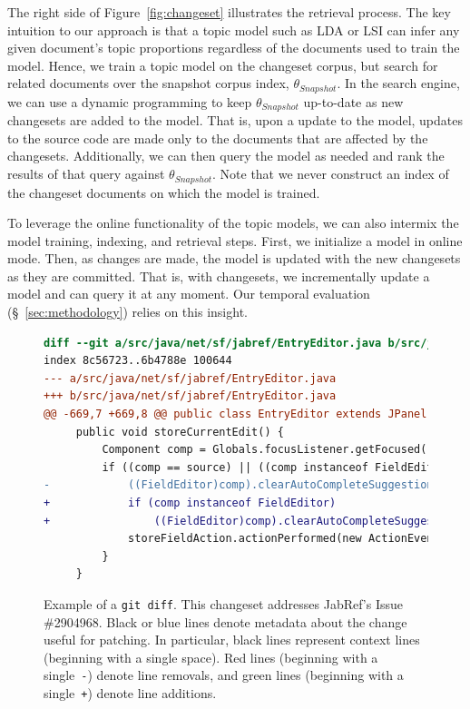 The right side of Figure~\ref{fig:changeset} illustrates the retrieval process.
The key intuition to our approach is that a topic model such as LDA or LSI
can infer any given document's topic proportions regardless of the documents used to train the model.
Hence, we train a topic model on the changeset corpus, but search for related documents over the snapshot corpus index, $\theta_{Snapshot}$.
In the search engine, we can use a dynamic programming to keep $\theta_{Snapshot}$ up-to-date as new changesets are added to the model.
That is, upon a update to the model, updates to the source code are made only to the documents that are affected by the changesets.
Additionally, we can then query the model as needed and rank the results of that query against $\theta_{Snapshot}$.
Note that we never construct an index of the changeset documents on which the model is trained.

To leverage the online functionality of the topic models, we can also intermix the model training, indexing, and retrieval steps.
First, we initialize a model in online mode.
Then, as changes are made, the model is updated with the new changesets as they are committed.
That is, with changesets, we incrementally update a model and can query it at any moment.
Our temporal evaluation (\S~\ref{sec:methodology}) relies on this insight.


\begin{figure}[t]
\centering
\footnotesize
\begin{lstlisting}[language=diff, basicstyle=\ttfamily]
diff --git a/src/java/net/sf/jabref/EntryEditor.java b/src/java/net/sf/jabref/EntryEditor.java
index 8c56723..6b4788e 100644
--- a/src/java/net/sf/jabref/EntryEditor.java
+++ b/src/java/net/sf/jabref/EntryEditor.java
@@ -669,7 +669,8 @@ public class EntryEditor extends JPanel implements VetoableChangeListener {
     public void storeCurrentEdit() {
         Component comp = Globals.focusListener.getFocused();
         if ((comp == source) || ((comp instanceof FieldEditor) && this.isAncestorOf(comp))) {
-            ((FieldEditor)comp).clearAutoCompleteSuggestion();
+            if (comp instanceof FieldEditor)
+                ((FieldEditor)comp).clearAutoCompleteSuggestion();
             storeFieldAction.actionPerformed(new ActionEvent(comp, 0, ""));
         }
     }
\end{lstlisting}
\caption{Example of a \texttt{git diff}.
This changeset addresses JabRef's Issue \#2904968.
Black or blue lines denote metadata about the change useful for patching.
In particular, black lines represent context lines (beginning with a single space).
Red lines (beginning with a single~\texttt{-}) denote line removals,
and green lines (beginning with a single~\texttt{+}) denote line additions.}
\label{fig:diff}
\vspace{-10pt}
\end{figure}
